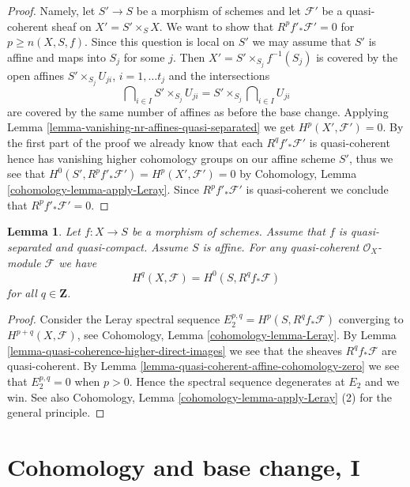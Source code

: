 \documentclass{stacks-project}
\theoremstyle{plain}
\newtheorem{lemma}[subsection]{Lemma}
\theoremstyle{definition}
\theoremstyle{remark}
\numberwithin{equation}{subsection}
\begin{document}
\begin{proof}
\medskip\noindent
Namely, let $S' \to S$ be a morphism of schemes and let
$\mathcal{F}'$ be a quasi-coherent sheaf on $X' = S' \times_S X$.
We want to show that $R^pf'_*\mathcal{F}' = 0$ for $p \geq n(X, S, f)$.
Since this question is local on $S'$ we may assume that $S'$ is affine
and maps into $S_j$ for some $j$. Then $X' = S' \times_{S_j} f^{-1}(S_j)$
is covered by the open affines $S' \times_{S_j} U_{ji}$, $i = 1, \ldots t_j$
and the intersections
$$
\bigcap\nolimits_{i \in I} S' \times_{S_j} U_{ji} =
S' \times_{S_j} \bigcap\nolimits_{i \in I} U_{ji}
$$
are covered by the same number of affines as before the base change.
Applying
Lemma \ref{lemma-vanishing-nr-affines-quasi-separated}
we get $H^p(X', \mathcal{F}') = 0$. By the first part of the proof
we already know that each $R^qf'_*\mathcal{F}'$ is quasi-coherent
hence has vanishing higher cohomology groups on our affine scheme $S'$,
thus we see that $H^0(S', R^pf'_*\mathcal{F}') = H^p(X', \mathcal{F}') = 0$
by Cohomology, Lemma \ref{cohomology-lemma-apply-Leray}.
Since $R^pf'_*\mathcal{F}'$ is quasi-coherent
we conclude that $R^pf'_*\mathcal{F}' = 0$.
\end{proof}

\begin{lemma}
\label{lemma-quasi-coherence-higher-direct-images-application}
Let $f : X \to S$ be a morphism of schemes.
Assume that $f$ is quasi-separated and quasi-compact.
Assume $S$ is affine.
For any quasi-coherent $\mathcal{O}_X$-module $\mathcal{F}$
we have
$$
H^q(X, \mathcal{F}) = H^0(S, R^qf_*\mathcal{F})
$$
for all $q \in \mathbf{Z}$.
\end{lemma}

\begin{proof}
Consider the Leray spectral sequence $E_2^{p, q} = H^p(S, R^qf_*\mathcal{F})$
converging to $H^{p + q}(X, \mathcal{F})$, see
Cohomology, Lemma \ref{cohomology-lemma-Leray}.
By Lemma \ref{lemma-quasi-coherence-higher-direct-images}
we see that the sheaves $R^qf_*\mathcal{F}$ are quasi-coherent.
By Lemma \ref{lemma-quasi-coherent-affine-cohomology-zero}
we see that $E_2^{p, q} = 0$ when $p > 0$.
Hence the spectral sequence degenerates at $E_2$ and we win.
See also
Cohomology, Lemma \ref{cohomology-lemma-apply-Leray} (2)
for the general principle.
\end{proof}








\section{Cohomology and base change, I}
\label{section-cohomology-and-base-change}
\end{document}
